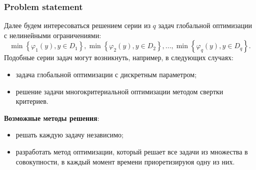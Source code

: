 \documentclass[aspectratio=1610]{beamer}
\begin{document}
\begin{frame}
  \frametitle{Problem statement}
  Далее будем интересоваться решением серии из \(q\) задач глобальной оптимизации с нелинейными ограничениями:
  \begin{displaymath}
    \min\left\{\varphi_1(y), y\in D_1 \right\}, \min\left\{\varphi_2(y), y\in D_2\right\},..., \min\left\{\varphi_q(y), y\in D_q\right\}.
  \end{displaymath}
  Подобные серии задач могут возникнуть, например, в следующих случаях:
  \begin{itemize}
    \item задача глобальной оптимизации с дискретным параметром;
    \item  решение задачи многокритериальной оптимизации методом свертки критериев.
  \end{itemize}
\textbf{Возможные методы решения}:
  \begin{itemize}
    \item решать каждую задачу независимо;
    \item разработать метод оптимизации, который решает все задачи из множества в совокупности, в каждый
    момент времени приоретизируюя одну из них.
  \end{itemize}
\end{frame}
\end{document}
